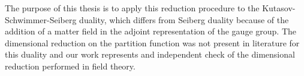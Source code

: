 \documentclass[a4paper,12pt]{article}
\begin{document}
The purpose of this thesis is to apply this reduction procedure to the Kutasov-Schwimmer-Seiberg duality, which differs from Seiberg duality because of the addition of a matter field in the adjoint representation of the gauge group.
The dimensional reduction on the partition function was not present in literature for this duality and our work represents and independent check of the dimensional reduction performed in field theory.
\end{document}
